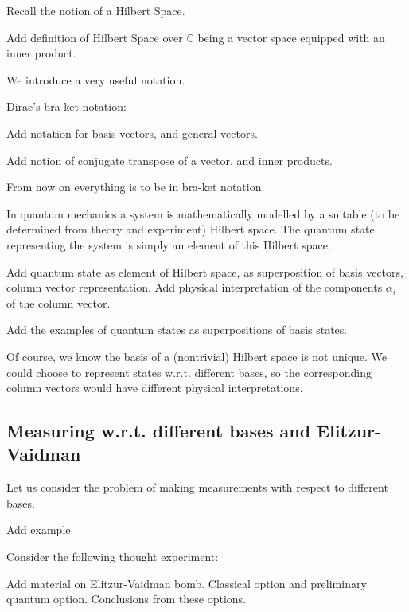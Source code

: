 Recall the notion of a Hilbert Space.
\begin{definition}
    Add definition of Hilbert Space over $\mathbb{C}$ being a vector space equipped with an inner product.
\end{definition}

We introduce a very useful notation.

Dirac's bra-ket notation:
\begin{definition}
    Add notation for basis vectors, and general vectors.
\end{definition}

Add notion of conjugate transpose of a vector, and inner products.

From now on everything is to be in bra-ket notation.

In quantum mechanics a system is mathematically modelled by a suitable (to be determined from theory and experiment) Hilbert space. The quantum state representing the system is simply an element of this Hilbert space.
\begin{definition}
    Add quantum state as element of Hilbert space, as superposition of basis vectors, column vector representation. Add physical interpretation of the components $\alpha_i$ of the column vector.
\end{definition}

\begin{example}
    Add the examples of quantum states as superpositions of basis states.
\end{example}

Of course, we know the basis of a (nontrivial) Hilbert space is not unique. We could choose to represent states w.r.t. different bases, so the corresponding column vectors would have different physical interpretations.


\subsection{Measuring w.r.t. different bases and Elitzur-Vaidman}
Let us consider the problem of making measurements with respect to different bases.
\begin{example}
    Add example
\end{example}

Consider the following thought experiment: 

Add material on Elitzur-Vaidman bomb. Classical option and preliminary quantum option. Conclusions from these options.


